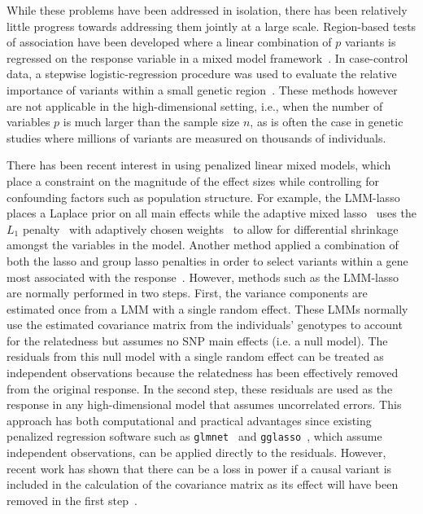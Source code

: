 \documentclass[12pt,letter]{article}\usepackage[]{graphicx}\usepackage[]{color}
\begin{document}
While these problems have been addressed in isolation, there has been relatively little progress towards addressing them jointly at a large scale.
Region-based tests of association have been developed where a linear combination of $p$ variants is regressed on the response variable in a mixed model framework~\citep{oualkacha2013adjusted}.
In case-control data, a stepwise logistic-regression procedure was used to evaluate the relative importance of variants within a small genetic region~\citep{cordell2002unified}.
These methods however are not applicable in the high-dimensional setting, i.e., when the number of variables $p$ is much larger than the sample size $n$, as is often the case in genetic studies where millions of variants are measured on thousands of individuals.

There has been recent interest in using penalized linear mixed models, which place a constraint on the magnitude of the effect sizes while controlling for confounding factors such as population structure.
For example, the LMM-lasso~\citep{rakitsch2013lasso} places a Laplace prior on all main effects while the adaptive mixed lasso~\citep{wang2011identifying} uses the $L_1$ penalty~\citep{tibshirani1996regression} with adaptively chosen weights~\citep{zou2006adaptive} to allow for differential shrinkage amongst the variables in the model.
Another method applied a combination of both the lasso and group lasso penalties in order to select variants within a gene most associated with the response~\citep{ding20142}.
However, methods such as the LMM-lasso are normally performed in two steps. First, the variance components are estimated once from a LMM with a single random effect. These LMMs normally use the estimated covariance matrix from the individuals' genotypes to account for the relatedness but assumes no SNP main effects (i.e. a null model).
The residuals from this null model with a single random effect can be treated as independent observations because the relatedness has been effectively removed from the original response.
In the second step, these residuals are used as the response in any high-dimensional model that assumes uncorrelated errors.
This approach has both computational and practical advantages since existing penalized regression software such as \texttt{glmnet}~\citep{friedman2010regularization} and \texttt{gglasso}~\citep{yang2015fast}, which assume independent observations, can be applied directly to the residuals.
However, recent work has shown that there can be a loss in power if a causal variant is included in the calculation of the covariance matrix as its effect will have been removed in the first step~\citep{oualkacha2013adjusted,yang2014advantages}.
\end{document}
